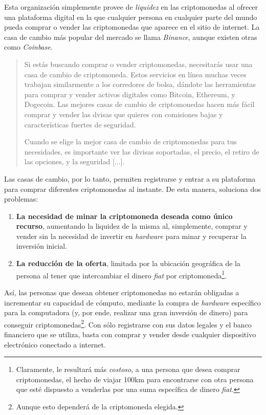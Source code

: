 \documentclass[12pt,a4paper,twoside]{book}
\begin{document}
Esta organización simplemente provee de \textit{liquidez} en las criptomonedas al ofrecer una plataforma digital en la que cualquier persona en cualquier parte del mundo pueda comprar o vender las criptomonedas que aparece en el sitio de internet. La casa de cambio más popular del mercado se llama \textit{Binance}, aunque existen otras como \textit{Coinbase}.

\begin{quotation}
Si estás buscando comprar o vender criptomonedas, necesitarás usar una casa de cambio de criptomoneda. Estos servicios en línea muchas veces trabajan similarmente a los corredores de bolsa, dándote las herramientas para comprar y vender activos digitales como Bitcoin, Ethereum, y Dogecoin. Las mejores casas de cambio de criptomonedas hacen más fácil comprar y vender las dvisas que quieres con comisiones bajas y características fuertes de seguridad.

Cuando se elige la mejor casa de cambio de criptomonedas para tus necesidades, es importante ver las divisas soportadas, el precio, el retiro de las opciones, y la seguridad [...]. \cite{investopedia:exchanges}
\end{quotation}

Las casas de cambio, por lo tanto, permiten registrarse y entrar a su plataforma para comprar diferentes criptomonedas al instante. De esta manera, soluciona dos problemas:

\begin{enumerate}
\item \textbf{La necesidad de minar la criptomoneda deseada como único recurso}, aumentando la liquidez de la misma al, simplemente, comprar y vender sin la necesidad de invertir en \textit{hardware} para minar y recuperar la inversión inicial.
\item \textbf{La reducción de la oferta}, limitada por la ubicación geográfica de la persona al tener que intercambiar el dinero \textit{fiat} por criptomoneda\footnote{Claramente, le resultará más \textit{costoso}, a una persona que desea comprar criptomonedas, el hecho de viajar 100km para encontrarse con otra persona que esté dispuesto a venderlas por una suma específica de dinero \textit{fiat}.}.
\end{enumerate}

Así, las personas que desean obtener criptomonedas no estarán obligadas a incrementar su capacidad de cómputo, mediante la compra de \textit{hardware} específico para la computadora (y, por ende, realizar una gran inversión de dinero) para conseguir criptomonedas\footnote{Aunque esto dependerá de la criptomoneda elegida.}. Con sólo registrarse con sus datos legales y el banco financiero que se utiliza, basta con comprar y vender desde cualquier dispositivo electrónico conectado a internet.
\end{document}
